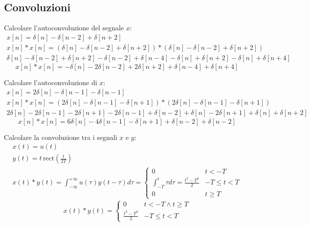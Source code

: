\documentclass{article}
\begin{document}
\subsection{Convoluzioni}

Calcolare l'autoconvoluzione del segnale $x$:
\begin{gather*}
    x[n]=\delta[n]-\delta[n-2]+\delta[n+2]\\
    x[n]*x[n]=(\delta[n]-\delta[n-2]+\delta[n+2])*(\delta[n]-\delta[n-2]+\delta[n+2])\\
    \delta[n]-\delta[n-2]+\delta[n+2]-\delta[n-2]+\delta[n-4]-\delta[n]+\delta[n+2]-\delta[n]+\delta[n+4]
\end{gather*}
\begin{equation}
    x[n]*x[n]=-\delta[n]-2\delta[n-2]+2\delta[n+2]+\delta[n-4]+\delta[n+4]
\end{equation}




Calcolare l'autoconvoluzione di $x$:
\begin{gather*}
    x[n]=2\delta[n]-\delta[n-1]-\delta[n-1]\\
    x[n]*x[n]=(2\delta[n]-\delta[n-1]-\delta[n+1])*(2\delta[n]-\delta[n-1]-\delta[n+1])\\
    2\delta[n]-2\delta[n-1]-2\delta[n+1]-2\delta[n-1]+\delta[n-2]+\delta[n]-2\delta[n+1]+\delta[n]+\delta[n+2]
\end{gather*}
\begin{equation}
    x[n]*x[n]=6\delta[n]-4\delta[n-1]-\delta[n+1]+\delta[n-2]+\delta[n-2]
\end{equation}



Calcolare la convoluzione tra i segnali $x$ e $y$:
\begin{gather*}
    x(t)=u(t)\\
    y(t)=t\,\mbox{rect}\displaystyle\left(\frac{t}{2T}\right)\\
    x(t)*y(t)=\displaystyle\int_{-\infty}^{+\infty}u(\tau)y(t-\tau)d\tau=\begin{cases}
        0&t<-T\\
        \displaystyle\int_{-T}^{t}\tau d\tau=\frac{t^2-T^2}{2}&-T\leq t<T\\
        0& t\geq T
    \end{cases}
\end{gather*}
\begin{equation}
    x(t)*y(t)=\begin{cases}
        0& t<-T\land t\geq T\\
        \displaystyle\frac{t^2-T^2}{2}&-T\leq t<T
    \end{cases}
\end{equation}
\end{document}
